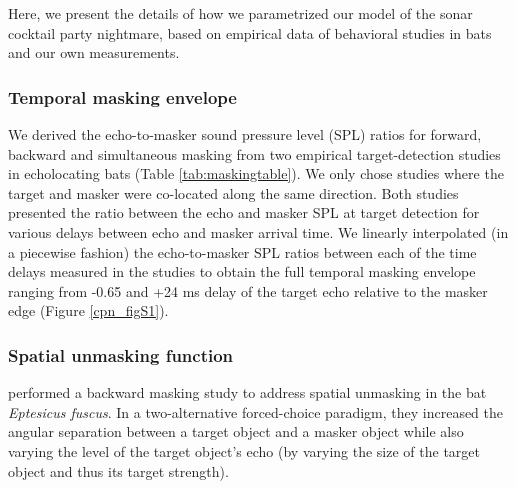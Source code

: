 \documentclass[
]{book}
\begin{document}
Here, we present the details of how we parametrized our model of the sonar cocktail party nightmare, based on empirical data of behavioral studies in bats and our own measurements.

\hypertarget{temporal-masking-envelope}{%
\subsubsection{\texorpdfstring{Temporal masking envelope \label{cpn_tempmasking}}{Temporal masking envelope }}\label{temporal-masking-envelope}}

We derived the echo-to-masker sound pressure level (SPL) ratios for forward, backward and simultaneous masking from two empirical target-detection studies in echolocating bats (Table \ref{tab:maskingtable}). We only chose studies where the target and masker were co-located along the same direction. Both studies presented the ratio between the echo and masker SPL at target detection for various delays between
echo and masker arrival time. We linearly interpolated (in a piecewise fashion) the echo-to-masker SPL ratios between each of the time delays measured in the studies to obtain the full temporal masking envelope ranging from -0.65 and +24 ms delay of the target echo relative to the masker edge (Figure \ref{cpn_figS1}).

\hypertarget{spatial-unmasking-function}{%
\subsubsection{\texorpdfstring{Spatial unmasking function \label{cpn_spatiunmasking}}{Spatial unmasking function }}\label{spatial-unmasking-function}}

\citet{suemer2009a} performed a backward masking study to address spatial unmasking in the bat \emph{Eptesicus fuscus}. In a two-alternative forced-choice paradigm, they increased the angular separation between a target object and a masker object while also varying the level of the target object's echo (by varying the size of the target object and thus its target strength).
\end{document}

